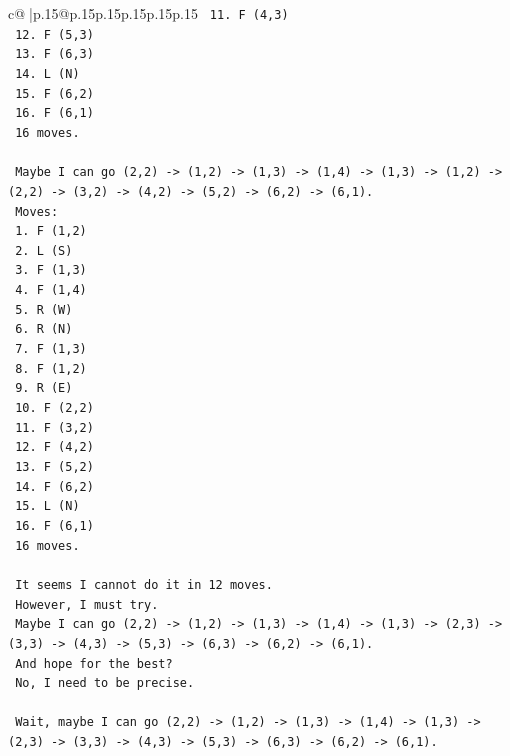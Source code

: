 \documentclass{article}
\begin{document}
{\begin{supertabular}{c@{$\;$}|p{.15\linewidth}@{}p{.15\linewidth}p{.15\linewidth}p{.15\linewidth}p{.15\linewidth}p{.15\linewidth}}
{{{\texttt{   11. F (4,3)} \\
\texttt{   12. F (5,3)} \\
\texttt{   13. F (6,3)} \\
\texttt{   14. L (N)} \\
\texttt{   15. F (6,2)} \\
\texttt{   16. F (6,1)} \\
\texttt{   16 moves.} \\
\\ 
\texttt{   Maybe I can go (2,2) {-}> (1,2) {-}> (1,3) {-}> (1,4) {-}> (1,3) {-}> (1,2) {-}> (2,2) {-}> (3,2) {-}> (4,2) {-}> (5,2) {-}> (6,2) {-}> (6,1).} \\
\texttt{   Moves:} \\
\texttt{   1. F (1,2)} \\
\texttt{   2. L (S)} \\
\texttt{   3. F (1,3)} \\
\texttt{   4. F (1,4)} \\
\texttt{   5. R (W)} \\
\texttt{   6. R (N)} \\
\texttt{   7. F (1,3)} \\
\texttt{   8. F (1,2)} \\
\texttt{   9. R (E)} \\
\texttt{   10. F (2,2)} \\
\texttt{   11. F (3,2)} \\
\texttt{   12. F (4,2)} \\
\texttt{   13. F (5,2)} \\
\texttt{   14. F (6,2)} \\
\texttt{   15. L (N)} \\
\texttt{   16. F (6,1)} \\
\texttt{   16 moves.} \\
\\ 
\texttt{   It seems I cannot do it in 12 moves.} \\
\texttt{   However, I must try.} \\
\texttt{   Maybe I can go (2,2) {-}> (1,2) {-}> (1,3) {-}> (1,4) {-}> (1,3) {-}> (2,3) {-}> (3,3) {-}> (4,3) {-}> (5,3) {-}> (6,3) {-}> (6,2) {-}> (6,1).} \\
\texttt{   And hope for the best?} \\
\texttt{   No, I need to be precise.} \\
\\ 
\texttt{   Wait, maybe I can go (2,2) {-}> (1,2) {-}> (1,3) {-}> (1,4) {-}> (1,3) {-}> (2,3) {-}> (3,3) {-}> (4,3) {-}> (5,3) {-}> (6,3) {-}> (6,2) {-}> (6,1).} \\
}}}
\end{supertabular}}
\end{document}
